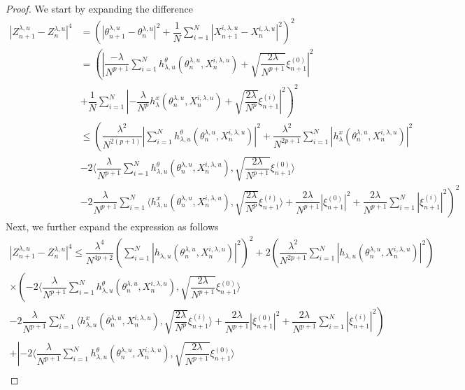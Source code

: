 \documentclass[a4paper, 10pt]{article}
\theoremstyle{plain}%
\begin{document}
\begin{proof} We start by expanding the difference
\begin{align*}
|Z^{\lambda,u}_{n+1}-Z^{\lambda,u}_{n}|^4&=\left(|\theta^{\lambda,u}_{n+1}-\theta^{\lambda,u}_n|^2+\dfrac{1}{N}\sum_{i=1}^N|X_{n+1}^{i,\lambda,u}-X_n^{i,\lambda,u}|^2\right)^2\\
&=\left(\left|\dfrac{-\lambda}{N^{p+1}}\sum_{i=1}^N h^{\theta}_{\lambda,u}(\theta_n^{\lambda,u},X_n^{i,\lambda,u})+\sqrt{\dfrac{2\lambda}{N^{p+1}}}\xi_{n+1}^{(0)}\right|^2\right.\\
&\left.+\dfrac{1}{N}\sum_{i=1}^N\left|-\dfrac{\lambda}{N^p} h^{x}_{\lambda}(\theta_n^{\lambda,u},X_n^{i,\lambda,u})+\sqrt{\dfrac{2\lambda}{N^p}}\xi_{n+1}^{(i)}\right|^2\right)^2\\
&\leq \left(\dfrac{\lambda^2}{N^{2(p+1)}}|\sum_{i=1}^Nh^{\theta}_{\lambda,u}(\theta_n^{\lambda,u},X_n^{i,\lambda,u})|^2+\dfrac{\lambda^2}{N^{2p+1}}\sum_{i=1}^N| h^{x}_{\lambda}(\theta_n^{\lambda,u},X_n^{i,\lambda,u})|^2\right.\\
&-2\langle\dfrac{\lambda}{N^{p+1}}\sum_{i=1}^N h^{\theta}_{\lambda,u}(\theta_n^{\lambda,u},X_n^{i,\lambda,u}),\sqrt{\dfrac{2\lambda}{N^{p+1}}}\xi_{n+1}^{(0)}\rangle\\
&\left.-2\dfrac{\lambda}{N^{p+1}}\sum_{i=1}^N\langle h^x_{\lambda,u}(\theta_n^{\lambda,u},X_n^{i,\lambda,u}),\sqrt{\dfrac{2\lambda}{N^p}}\xi_{n+1}^{(i)} \rangle+\dfrac{2\lambda}{N^{p+1}}|\xi_{n+1}^{(0)}|^2+\dfrac{2\lambda}{N^{p+1}}\sum_{i=1}^N|\xi_{n+1}^{(i)} |^2 \right)^2
\end{align*}
Next, we further expand the expression as follows
\begin{gather}
|Z^{\lambda,u}_{n+1}-Z^{\lambda,u}_{n}|^4\leq\dfrac{\lambda^4}{N^{4p+2}}\left(\sum_{i=1}^N|h_{\lambda,u}(\theta_n^{\lambda,u},X_n^{i,\lambda,u})|^2\right)^2+2\left(\dfrac{\lambda^2}{N^{2p+1}}\sum_{i=1}^N|h_{\lambda,u}(\theta_n^{\lambda,u},X_n^{i,\lambda,u})|^2\right)\nonumber\\
\times\left(-2\langle\dfrac{\lambda}{N^{p+1}}\sum_{i=1}^Nh^{\theta}_{\lambda,u}(\theta_n^{\lambda,u},X_n^{i,\lambda,u}),\sqrt{\dfrac{2\lambda}{N^{p+1}}}\xi_{n+1}^{(0)}\rangle\right.\nonumber\\ \left.-2\dfrac{\lambda}{N^{p+1}}\sum_{i=1}^N\langle h^x_{\lambda,u}(\theta_n^{\lambda,u},X_n^{i,\lambda,u}),\sqrt{\dfrac{2\lambda}{N^p}}\xi_{n+1}^{(i)}  \rangle
+\dfrac{2\lambda}{N^{p+1}}|\xi_{n+1}^{(0)}|^2+\dfrac{2\lambda}{N^{p+1}}\sum_{i=1}^N|\xi_{n+1}^{(i)} |^2\right)\nonumber\\
+\left|-2\langle\dfrac{\lambda}{N^{p+1}}\sum_{i=1}^Nh^{\theta}_{\lambda,u}(\theta_n^{\lambda,u},X_n^{i,\lambda,u}),\sqrt{\dfrac{2\lambda}{N^{p+1}}}\xi_{n+1}^{(0)}\rangle\right.\nonumber\\

\end{gather}
\end{proof}
\end{document}
